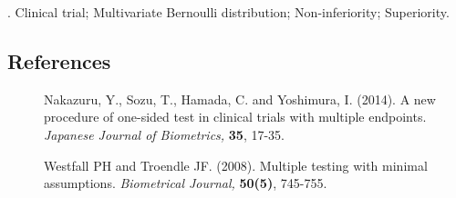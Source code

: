 \documentclass[12pt]{article}
\begin{document}
.
Clinical trial; Multivariate Bernoulli distribution; Non-inferiority; Superiority.
%        
%
%        

\subsection*{References}

\begin{description}
\item[] Nakazuru, Y., Sozu, T., Hamada, C. and Yoshimura, I. (2014). A new procedure of one-sided test in clinical trials with multiple endpoints. \textit{Japanese Journal of Biometrics,} \textbf{35}, 17-35.
\item[] Westfall PH and Troendle JF. (2008). Multiple testing with minimal assumptions. \textit{Biometrical Journal,} \textbf{50(5)}, 745-755.
\end{description}
\end{document}
